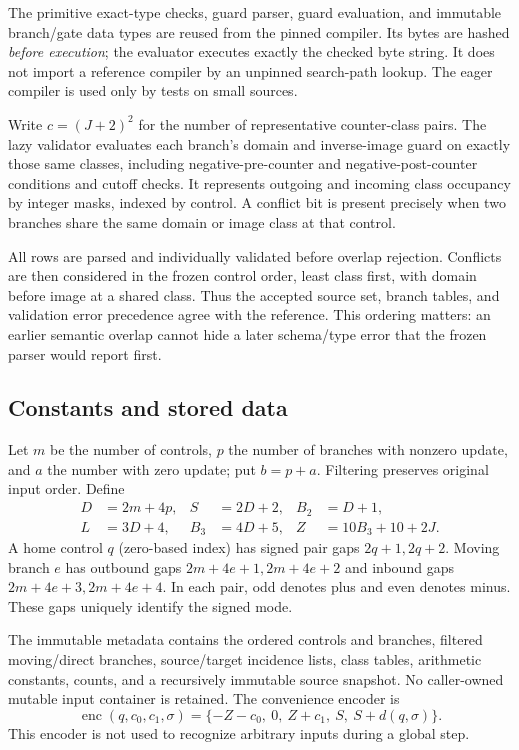 \documentclass[11pt,a4paper]{article}
\numberwithin{equation}{section}
\begin{document}
The primitive exact-type checks, guard parser, guard evaluation, and immutable branch/gate data types are reused from the pinned compiler. Its bytes are hashed \emph{before execution}; the evaluator executes exactly the checked byte string. It does not import a reference compiler by an unpinned search-path lookup. The eager compiler is used only by tests on small sources.

Write $c=(J+2)^2$ for the number of representative counter-class pairs. The lazy validator evaluates each branch's domain and inverse-image guard on exactly those same classes, including negative-pre-counter and negative-post-counter conditions and cutoff checks. It represents outgoing and incoming class occupancy by integer masks, indexed by control. A conflict bit is present precisely when two branches share the same domain or image class at that control.

All rows are parsed and individually validated before overlap rejection. Conflicts are then considered in the frozen control order, least class first, with domain before image at a shared class. Thus the accepted source set, branch tables, and validation error precedence agree with the reference. This ordering matters: an earlier semantic overlap cannot hide a later schema/type error that the frozen parser would report first.

\subsection{Constants and stored data}
Let $m$ be the number of controls, $p$ the number of branches with nonzero update, and $a$ the number with zero update; put $b=p+a$. Filtering preserves original input order. Define
\begin{align*}
D&=2m+4p,&S&=2D+2,&B_2&=D+1,\\
L&=3D+4,&B_3&=4D+5,&Z&=10B_3+10+2J.
\end{align*}
A home control $q$ (zero-based index) has signed pair gaps $2q+1,2q+2$. Moving branch $e$ has outbound gaps $2m+4e+1,2m+4e+2$ and inbound gaps $2m+4e+3,2m+4e+4$. In each pair, odd denotes plus and even denotes minus. These gaps uniquely identify the signed mode.

The immutable metadata contains the ordered controls and branches, filtered moving/direct branches, source/target incidence lists, class tables, arithmetic constants, counts, and a recursively immutable source snapshot. No caller-owned mutable input container is retained. The convenience encoder is
\[
\operatorname{enc}(q,c_0,c_1,\sigma)
=\{-Z-c_0,\ 0,\ Z+c_1,\ S,\ S+d(q,\sigma)\}.
\]
This encoder is not used to recognize arbitrary inputs during a global step.
\end{document}
